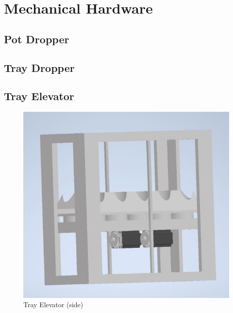 \documentclass[12pt, titlepage]{article}
\begin{document}
\section{Mechanical Hardware}

\subsection{Pot Dropper}

\subsection{Tray Dropper}

\subsection{Tray Elevator}
\begin{figure}[H]
  \centering
  \includegraphics{Tray_Elevator.jpg}
  \caption{Tray Elevator (side)}
  \label{fig:elevator1}
\end{figure}
\end{document}
